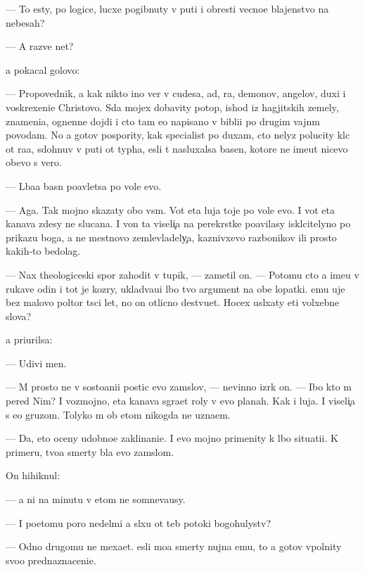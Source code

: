 \documentclass[10pt]{book}
\begin{document}
— To {\y}esty, po logice, lucxe pogibnuty v puti i obresti vecno{\y}e blajenstvo na nebesah?

— A razve net?

{\Y}a pokacal golovo{\y}:

— Propovednik, {\y}a kak nikto ino{\y} ver{\io} v cudesa, ad, ra{\y}, demonov, angelov, duxi i voskrexeni{\y}e Christovo. S{\io}da mojex dobavity potop, ishod iz hagjitskih zemely, znameni{\y}a, ognenn{\yi}{\y}e dojdi i cto tam {\y}e{\x}o napisano v bibli{\y}i po drugim vajn{\yi}m povodam. No {\y}a gotov pospority, kak specialist po duxam, cto nelyz{\ia} polucity kl{\io}c ot ra{\y}a, sdohnuv v puti ot typha, {\y}esli t{\yi} nasluxalsa basen, kotor{\yi}{\y}e ne ime{\y}ut nicevo ob{\x}evo s vero{\y}.

— L{\io}ba{\y}a basn{\ia} po{\y}avl{\ia}{\y}etsa po vole {\Y}evo.

— Aga. Tak mojno skazaty obo vs{\e}m. Vot eta luja toje po vole {\y}evo. I vot eta kanava zdesy ne sluca{\y}na. I von ta viseli{\c}a na perekr{\e}stke po{\y}avilasy iskl{\io}citelyno po prikazu boga, a ne mestnovo zemlevladely{\c}a, kaznivxevo razbo{\y}nikov ili prosto kakih-to bedolag.

— Nax theologiceski{\y} spor zahodit v tupik, — zametil on. — Potomu cto {\y}a ime{\y}u v rukave odin i tot je koz{\yi}ry, uklad{\yi}va{\y}u{\x}i{\y} l{\io}bo{\y} tvo{\y} argument na obe lopatki. {\Y}emu uje bez malovo poltor{\yi} t{\yi}s{\ia}ci let, no on otlicno de{\y}stvu{\y}et. Hocex usl{\yi}xaty eti volxebn{\yi}{\y}e slova?

{\Y}a pri{\x}urilsa:

— Udivi men{\ia}.

— M{\yi} prosto ne v sosto{\y}ani{\y}i postic {\Y}evo zam{\yi}slov, — nevinno izr{\e}k on. — Ibo kto m{\yi} pered Nim? I vozmojno, eta kanava s{\yi}gra{\y}et roly v {\Y}evo planah. Kak i luja. I viseli{\c}a s {\y}e{\y}o gruzom. Tolyko m{\yi} ob etom nikogda ne uzna{\y}em.

— Da, eto oceny udobno{\y}e zaklinani{\y}e. I {\y}evo mojno primenity k l{\io}bo{\y} situati{\y}i. K primeru, tvo{\y}a smerty b{\yi}la {\y}evo zam{\yi}slom.

On hihiknul:

— {\Y}a ni na minutu v etom ne somneva{\y}usy.

— I poetomu poro{\y} nedel{\ia}mi {\y}a sl{\yi}xu ot teb{\ia} potoki bogohulystv?

— Odno drugomu ne mexa{\y}et. {\Y}esli mo{\y}a smerty nujna {\Y}emu, to {\y}a gotov v{\yi}polnity svo{\y}o prednaznaceni{\y}e.
\end{document}
